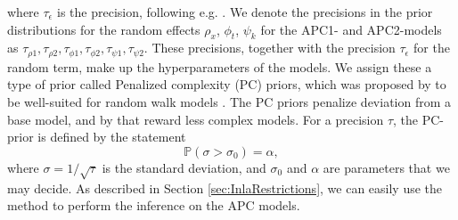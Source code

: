 where $\tau_\epsilon$ is the precision, following e.g. \textcite{Besag1995}. We denote the precisions in the prior distributions for the random effects $\rho_x$, $\phi_t$, $\psi_k$ for the APC1- and APC2-models as $\tau_{\rho 1}, \tau_{\rho 2}, \tau_{\phi 1}, \tau_{\phi 2}, \tau_{\psi 1}, \tau_{\psi 2}$. These precisions, together with the precision $\tau_\epsilon$ for the random term, make up the hyperparameters of the models. We assign these a type of prior called Penalized complexity (PC) priors, which was proposed by \textcite{SimpsonRueRiebler2017} to be well-suited for random walk models \parencite{Rubio2020}. The PC priors penalize deviation from a base model, and by that reward less complex models. For a precision $\tau$, the PC-prior is defined by the statement \begin{equation}
    \mathbb{P}(\sigma > \sigma_0) = \alpha,
\end{equation}
where $\sigma = 1/\sqrt{\tau}$ is the standard deviation, and $\sigma_0$ and $\alpha$ are parameters that we may decide. As described in Section \ref{sec:InlaRestrictions}, we can easily use the \inla method to perform the inference on the APC models. 


